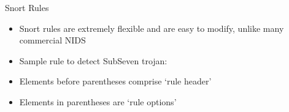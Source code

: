 \begin{frame}[t]{Snort Rules}
  \fontsize{15}{18}\selectfont
  \vspace{0.1cm}
  \begin{itemize}
    \item Snort rules are extremely flexible and are easy to modify, unlike many commercial NIDS
    \item Sample rule to detect SubSeven trojan:
  \end{itemize}
  \vspace{0.15cm}
  \vspace{0.2cm}
  \begin{itemize}
    \item Elements before parentheses comprise `rule header'
    \item Elements in parentheses are `rule options'
  \end{itemize}
\end{frame}
